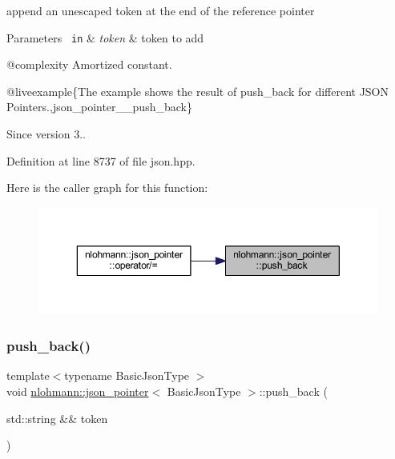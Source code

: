 append an unescaped token at the end of the reference pointer 


\begin{DoxyParams}[1]{Parameters}
\mbox{\texttt{ in}}  & {\em token} & token to add\\
\hline
\end{DoxyParams}
@complexity Amortized constant.

@liveexample\{The example shows the result of {\ttfamily push\+\_\+back} for different J\+S\+ON Pointers.,json\+\_\+pointer\+\_\+\+\_\+push\+\_\+back\}

\begin{DoxySince}{Since}
version 3.. 
\end{DoxySince}


Definition at line 8737 of file json.\+hpp.

Here is the caller graph for this function\+:
\nopagebreak
\begin{figure}[H]
\begin{center}
\leavevmode
\includegraphics[width=350pt]{classnlohmann_1_1json__pointer_a697d12b5bd6205f8866691b166b7c7dc_icgraph}
\end{center}
\end{figure}
\mbox{\label{classnlohmann_1_1json__pointer_ac228b13596d3c34185da9fe61b570194}} 
\subsubsection{\texorpdfstring{push\_back()}{push\_back()}\hspace{0.1cm}{\footnotesize\ttfamily [2/2]}}
{\footnotesize\ttfamily template$<$typename Basic\+Json\+Type $>$ \\
void \mbox{\hyperlink{classnlohmann_1_1json__pointer}{nlohmann\+::json\+\_\+pointer}}$<$ Basic\+Json\+Type $>$\+::push\+\_\+back (\begin{DoxyParamCaption}\item[{std\+::string \&\&}]{token }\end{DoxyParamCaption})\hspace{0.3cm}{\ttfamily [inline]}}



